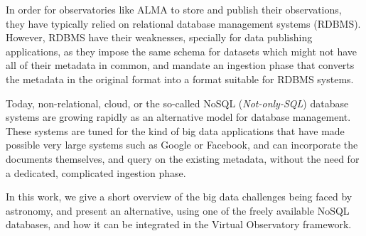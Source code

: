In order for observatories like ALMA to store and publish their observations, they have typically relied on relational database management systems (RDBMS). However, RDBMS have their weaknesses, specially for data publishing applications, as they impose the same schema for datasets which might not have all of their metadata in common, and mandate an ingestion phase that converts the metadata in the original format into a format suitable for RDBMS systems.

Today, non-relational, cloud, or the so-called NoSQL (\emph{Not-only-SQL}) database systems
are growing rapidly as an alternative model for database management. These systems are tuned for the kind of big data applications that have made possible very large systems such as Google or Facebook, and can incorporate the documents themselves, and query on the existing metadata, without the need for a dedicated, complicated ingestion phase.


In this work, we give a short overview of
the
big data 
challenges being faced by astronomy, %
and present an alternative, using one of the
freely available %
NoSQL databases, 
and how it can be integrated in the Virtual Observatory framework.